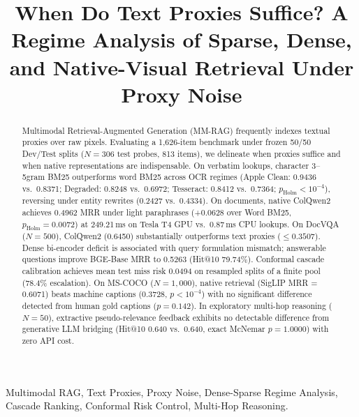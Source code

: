 \documentclass[conference]{IEEEtran}
\begin{document}
\title{When Do Text Proxies Suffice? A Regime Analysis of Sparse, Dense, and Native-Visual Retrieval Under Proxy Noise}

\author{
}

\maketitle

\begin{abstract}
Multimodal Retrieval-Augmented Generation (MM-RAG) frequently indexes textual proxies over raw pixels. Evaluating a 1,626-item benchmark under frozen 50/50 Dev/Test splits ($N=306$ test probes, 813 items), we delineate when proxies suffice and when native representations are indispensable. On verbatim lookups, character 3--5gram BM25 outperforms word BM25 across OCR regimes (Apple Clean: 0.9436 vs.\ 0.8371; Degraded: 0.8248 vs.\ 0.6972; Tesseract: 0.8412 vs.\ 0.7364; $p_{\text{Holm}} < 10^{-4}$), reversing under entity rewrites (0.2427 vs.\ 0.4334). On documents, native ColQwen2 achieves 0.4962 MRR under light paraphrases (+0.0628 over Word BM25, $p_{\text{Holm}} = 0.0072$) at 249.21\,ms on Tesla T4 GPU vs.\ 0.87\,ms CPU lookups. On DocVQA ($N=500$), ColQwen2 (0.6450) substantially outperforms text proxies ($\le 0.3507$). Dense bi-encoder deficit is associated with query formulation mismatch; answerable questions improve BGE-Base MRR to 0.5263 (Hit@10 79.74\%). Conformal cascade calibration achieves mean test miss risk 0.0494 on resampled splits of a finite pool (78.4\% escalation). On MS-COCO ($N=1{,}000$), native retrieval (SigLIP MRR = 0.6071) beats machine captions (0.3728, $p < 10^{-4}$) with no significant difference detected from human gold captions ($p=0.142$). In exploratory multi-hop reasoning ($N=50$), extractive pseudo-relevance feedback exhibits no detectable difference from generative LLM bridging (Hit@10 0.640 vs.\ 0.640, exact McNemar $p = 1.0000$) with zero API cost.
\end{abstract}

\begin{IEEEkeywords}
Multimodal RAG, Text Proxies, Proxy Noise, Dense-Sparse Regime Analysis, Cascade Ranking, Conformal Risk Control, Multi-Hop Reasoning.
\end{IEEEkeywords}
\end{document}

